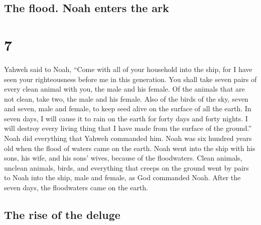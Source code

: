 \hypertarget{the-flood.-noah-enters-the-ark}{%
\subsection{The flood. Noah enters the
ark}\label{the-flood.-noah-enters-the-ark}}

\hypertarget{section-6}{%
\section{7}\label{section-6}}

 Yahweh said to Noah, ``Come with all of your household
into the ship, for I have seen your righteousness before me in this
generation.  You shall take seven pairs of every clean
animal with you, the male and his female. Of the animals that are not
clean, take two, the male and his female.  Also of the
birds of the sky, seven and seven, male and female, to keep seed alive
on the surface of all the earth.  In seven days, I will
cause it to rain on the earth for forty days and forty nights. I will
destroy every living thing that I have made from the surface of the
ground.''  Noah did everything that Yahweh commanded him.
 Noah was six hundred years old when the flood of waters
came on the earth.  Noah went into the ship with his sons,
his wife, and his sons' wives, because of the floodwaters.
 Clean animals, unclean animals, birds, and everything
that creeps on the ground  went by pairs to Noah into the
ship, male and female, as God commanded Noah.  After the
seven days, the floodwaters came on the earth.

\hypertarget{the-rise-of-the-deluge}{%
\subsection{The rise of the deluge}\label{the-rise-of-the-deluge}}

